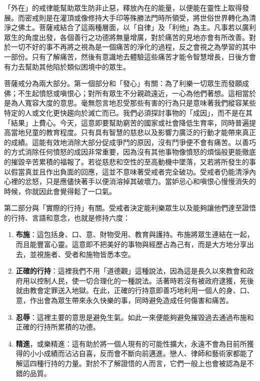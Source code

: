 「外在」的戒律能幫助眾生防非止惡，釋放內在的能量，以便能在靈性上取得發展。而密戒則是在灌頂或像修持大手印等殊勝法門時所領受，將世俗世界轉化為清淨之佛土。菩薩戒結合了這兩種層面，以「自律」及「利他」為主。凡事若以廣利眾生的角度出發，各個善行之功德將無量增廣，對於痛苦的見地亦會有所改善。對於一切不好的事不再將之視為是一個痛苦的淨化的過程，反之會視之為學習的其中一部份。只有了解痛苦，然後有意識地去體驗這些痛苦才能令智慧增長，日後方會有力去幫助其他陷於類似困境中的眾生。

菩薩戒分為兩大部分。第一個部分和「發心」有關：為了利樂一切眾生而發願成佛；不生起憤怒或嗔恨心；對所有眾生不分親疏遠近，一心為他們著想。這相當於是為人寬容大度的意思。毫無怨言地忍受那些有害的行為只是意味著我們縱容某些特定的人或文化更快趨向於滅亡而已。我們必須探討事物的「成因」，而不是在其「結果」上費心。今天，這意即要幫助窮苦的國家或社會降低生育率，同時普遍提高當地兒童的教育程度。只有具有智慧的慈悲以及影響力廣泛的行動才能帶來真正的成績。這能有效地消除大部分促成爭鬥的原因，沒有鬥爭便不會有痛苦。以善巧的方式消除任何憤怒的成因非常重要，因為沒有其他事物像憤怒的煩惱般更能徹底的摧毀辛苦累積的福報了。若從慈悲和空性的至高動機中墜落，又若將所發生的事以假當真並且作出負面的回應，這並不意味著受戒者完全破功。受戒者仍能清淨內心裡的忿怒，只是應儘快著手以便消溶掉其破壞力。當妒忌心和嗔恨心慢慢消失的時候，你就因此會覺得鬆了一口氣。

第二部分與「實際的行持」有關。受戒者決定能利樂眾生以及能夠讓他們達至證悟的行持、言語和意念，也就是修持六度：

\begin{enumerate}
\item
  \textbf{布施}：這包括身、口、意、財物受用、教育與護持。布施將眾生連結在一起，而且能豐富心靈。這意即不把美好的事物與經歷占為己有，而是大方地分享出去，並視施者、受者和施物皆悉本空。
\item
  \textbf{正確的行持}：這裡我們不用「道德觀」這種說法，因為這是長久以來教會和政府用以控制人民，使一切合理化的一種說法。活著時若沒有被政府逮獲，死後就由教會定罪送入地獄。在此，正確的行持意即善巧地利用一個人的身、口、意，作出會為眾生帶來永久快樂的事，同時避免造成任何傷害和痛苦。
\item
  \textbf{忍辱}：這裡主要的意思是避免生氣。如此一來便能夠避免摧毀過去通過布施和正確的行持所累積的功德。
\item
  \textbf{精進}，或樂精進：這有助於將一個人現有的可能性擴大，永遠不會為目前所獲得的小小成績而沾沾自喜，反而會不斷向前邁進。戀人、律師和藝術家都能了解這四種行持的力量。對於不了解證悟的人而言，它們一般上也會被認為是不錯的品質。
\end{enumerate}

